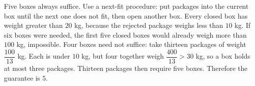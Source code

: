 Five boxes always suffice. Use a next-fit procedure: put packages into the current box until the next one does not fit, then open another box. Every closed box has weight greater than $20$ kg, because the rejected package weighs less than $10$ kg. If six boxes were needed, the first five closed boxes would already weigh more than $100$ kg, impossible.
Four boxes need not suffice: take thirteen packages of weight $\dfrac{100}{13}$ kg. Each is under $10$ kg, but four together weigh $\dfrac{400}{13}>30$ kg, so a box holds at most three packages. Thirteen packages then require five boxes. Therefore the guarantee is $\boxed5$.
